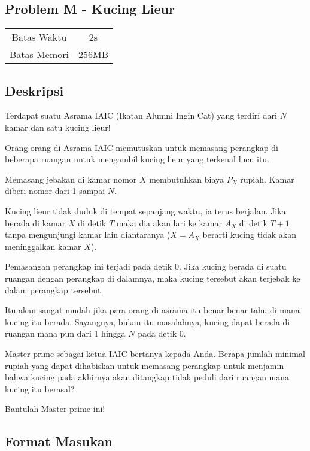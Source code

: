 \documentclass{article}
\begin{document}
\begin{center}
    \section*{Problem M - Kucing Lieur} %

    \begin{tabular}{ | c c | }
        \hline
        Batas Waktu  & 2s \\    %
        Batas Memori & 256MB \\  %
        \hline
    \end{tabular}
\end{center}

\subsection*{Deskripsi}

Terdapat suatu Asrama IAIC (Ikatan Alumni Ingin Cat) yang terdiri dari $N$ kamar dan satu kucing lieur!

Orang-orang di Asrama IAIC memutuskan untuk memasang perangkap di beberapa ruangan untuk mengambil kucing lieur yang terkenal lucu itu.

Memasang jebakan di kamar nomor $X$ membutuhkan biaya $P_X$ rupiah. Kamar diberi nomor dari 1 sampai $N$.

Kucing lieur tidak duduk di tempat sepanjang waktu, ia terus berjalan. Jika berada di kamar $X$ di detik $T$ maka dia akan lari ke kamar $A_X$ di detik $T + 1$ tanpa mengunjungi kamar lain diantaranya ($X = A_X$ berarti kucing tidak akan meninggalkan kamar $X$).

Pemasangan perangkap ini terjadi pada detik 0. Jika kucing berada di suatu ruangan dengan perangkap di dalamnya, maka kucing tersebut akan terjebak ke dalam perangkap tersebut.

Itu akan sangat mudah jika para orang di asrama itu benar-benar tahu di mana kucing itu berada. Sayangnya, bukan itu masalahnya, kucing dapat berada di ruangan mana pun dari 1 hingga $N$ pada detik 0.

Master prime sebagai ketua IAIC bertanya kepada Anda. Berapa jumlah minimal rupiah yang dapat dihabiskan untuk memasang perangkap untuk menjamin bahwa kucing pada akhirnya akan ditangkap tidak peduli dari ruangan mana kucing itu berasal?

Bantulah Master prime ini!

\subsection*{Format Masukan}
\end{document}

